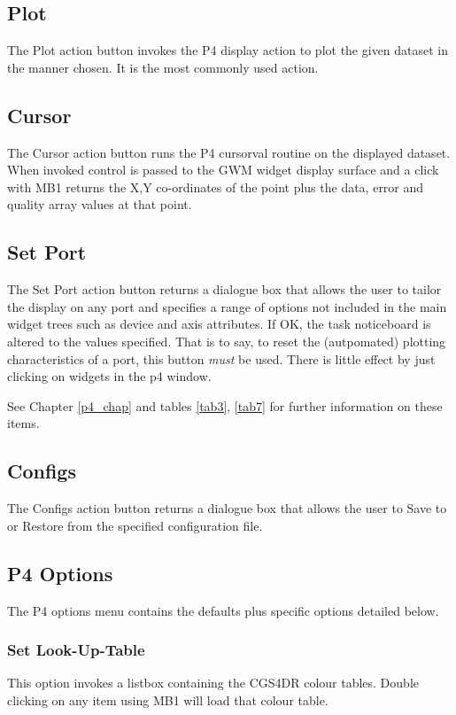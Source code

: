 \documentclass[a4paper]{book}
\renewcommand{\_}{{\tt\char'137}}
\begin{document}
\subsection{Plot}
The {\sf Plot} action button invokes the P4 display action to plot the given dataset
in the manner chosen. It is the most commonly used action.

\subsection{Cursor}
The {\sf Cursor} action button runs the P4 cursorval routine on the displayed dataset.
When invoked control is passed to the GWM widget display surface and a click with
MB1 returns the X,Y co-ordinates of the point plus the data, error and quality array
values at that point.

\subsection{Set Port}
The {\sf Set Port} action button returns a dialogue box that
allows the user to tailor the display on any port and specifies a range of
options not included in the main widget trees such as device and axis attributes. If OK, the
task noticeboard is altered to the values specified. That is to say, to reset the (autpomated)
plotting characteristics of a port, this button {\em must} be used. There is little effect
by just clicking on widgets in the p4 window.

See Chapter \ref{p4_chap} and tables
\ref{tab3}, \ref{tab7} for further information on these items.

\subsection{Configs}
The {\sf Configs} action button returns a dialogue box that
allows the user to {\sf Save} to or {\sf Restore} from the specified configuration
file.

\subsection{P4 Options}
The P4 options menu contains the defaults plus specific options detailed below.

\subsubsection{Set Look-Up-Table}
This option invokes a listbox containing the CGS4DR colour tables. Double clicking
on any item using MB1 will load that colour table.
\end{document}
